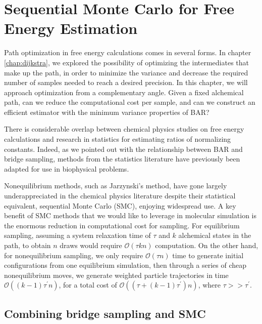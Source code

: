 
\chapter{Sequential Monte Carlo for Free Energy Estimation}
\label{chap:smc}

Path optimization in free energy calculations comes in several forms. 
In chapter \ref{chap:dijkstra}, we explored the possibility of optimizing the intermediates that make up the path, in order to minimize the variance and decrease the required number of samples needed to reach a desired precision.
In this chapter, we will approach optimization from a complementary angle. 
Given a fixed alchemical path, can we reduce the computational cost per sample, and can we construct an efficient estimator with the minimum variance properties of BAR?

There is considerable overlap between chemical physics studies on free energy calculations and research in statistics for estimating ratios of normalizing constants. 
Indeed, as we pointed out with the relationship between BAR and bridge sampling, methods from the statistics literature have previously been adapted for use in biophysical problems.

Nonequilibrium methods, such as Jarzynski's method\cite{jarzynski1997nonequilibrium1}, have gone largely underappreciated in the chemical physics literature despite their statistical equivalent, sequential Monte Carlo\cite{cappe2007overview, del2006sequential} (SMC), enjoying widespread use.
A key benefit of SMC methods that we would like to leverage in molecular simulation is the enormous reduction in computational cost for sampling.
For equilibrium sampling, assuming a system relaxation time of $\tau$ and $k$ alchemical states in the path, to obtain $n$ draws would require $\mathcal{O}(\tau k n)$ computation.
On the other hand, for nonequilibrium sampling, we only require $\mathcal{O}(\tau n)$ time to generate initial configurations from one equilibrium simulation, then through a series of cheap nonequilibrium moves, we generate weighted particle trajectories in time $\mathcal{O}((k-1)\tau^\prime n)$, for a total cost of $\mathcal{O}((\tau + (k-1)\tau^\prime)n)$, where $\tau >> \tau^\prime$. 

\section{Combining bridge sampling and SMC}

